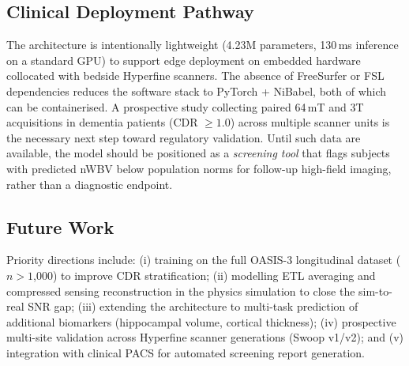 \subsection{Clinical Deployment Pathway}

The architecture is intentionally lightweight (4.23M parameters,
130\,ms inference on a standard GPU) to support edge deployment on
embedded hardware collocated with bedside Hyperfine scanners. The
absence of FreeSurfer or FSL dependencies reduces the software stack
to PyTorch + NiBabel, both of which can be containerised. A prospective
study collecting paired 64\,mT and 3T acquisitions in dementia patients
(CDR $\geq 1.0$) across multiple scanner units is the necessary next
step toward regulatory validation. Until such data are available, the
model should be positioned as a \emph{screening tool} that flags
subjects with predicted nWBV below population norms for follow-up
high-field imaging, rather than a diagnostic endpoint.

\subsection{Future Work}

Priority directions include:
(i) training on the full OASIS-3 longitudinal dataset
($n > 1$,000) to improve CDR stratification;
(ii) modelling ETL averaging and compressed sensing reconstruction
in the physics simulation to close the sim-to-real SNR gap;
(iii) extending the architecture to multi-task prediction of
additional biomarkers (hippocampal volume, cortical thickness);
(iv) prospective multi-site validation across Hyperfine scanner
generations (Swoop v1/v2); and
(v) integration with clinical PACS for automated screening report
generation.
